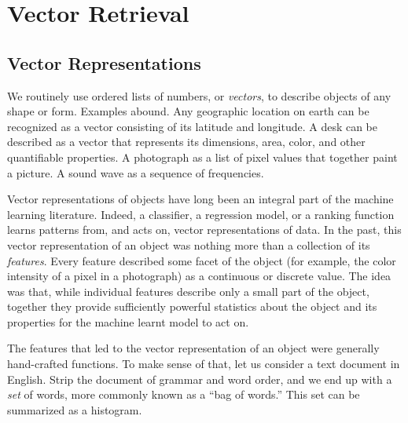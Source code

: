 \chapter{Vector Retrieval}
\label{chapter:flavors}


\section{Vector Representations}
We routinely use ordered lists of numbers, or \emph{vectors}, to describe objects of any
shape or form. Examples abound. Any geographic location on earth can be recognized as a vector
consisting of its latitude and longitude. A desk can be described as 
a vector that represents its dimensions, area, color, and other quantifiable properties.
A photograph as a list of pixel values that together paint a picture.
A sound wave as a sequence of frequencies.

Vector representations of objects have long been an integral part of the machine learning
literature. Indeed, a classifier, a regression model, or a ranking function learns patterns
from, and acts on, vector representations of data.
In the past, this vector representation of an object was nothing more than
a collection of its \emph{features}.
Every feature described some facet of the object (for example, the color intensity of a pixel
in a photograph) as a continuous or discrete value.
The idea was that, while individual features describe only a small part of the object,
together they provide sufficiently powerful statistics about the object and its properties
for the machine learnt model to act on.

The features that led to the vector representation of an object were generally hand-crafted functions.
To make sense of that, let us consider a text document in English.
Strip the document of grammar and word order, and we end up with a \emph{set} of words,
more commonly known as a ``bag of words.'' This set can be summarized as a histogram.

